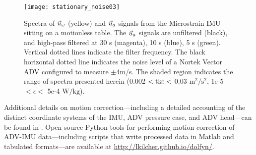 \begin{figure}
  \centering
  \label{fig:stationary_noise}
  \texttt{[image: stationary\_noise03]}
  \caption{Spectra of $\urot$ (yellow) and $\uacc$ signals from the Microstrain IMU sitting on a motionless table. The $\uacc$ signals are unfiltered (black), and high-pass filtered at 30 s (magenta), 10 s (blue), 5 s (green). Vertical dotted lines indicate the filter frequency. The black horizontal dotted line indicates the noise level of a Nortek Vector ADV configured to measure $\pm$4m/s. The shaded region indicates the range of spectra presented herein (0.002 $< \mathrm{tke} <$ 0.03 $\mathrm{m^2/s^2}$, 1e-5 $< \epsilon <$ 5e-4 $\mathrm{W/kg}$).}
\end{figure}

Additional details on motion correction---including a detailed accounting of the distinct coordinate systems of the IMU, ADV pressure case, and ADV head---can be found in \cite{Kilcher++2016}. Open-source Python tools for performing motion correction of ADV-IMU data---including scripts that write processed data in Matlab and tabulated formats---are available at \url{http://lkilcher.github.io/dolfyn/}.

\def\ue{\ensuremath{\vec{u}\earth}}

